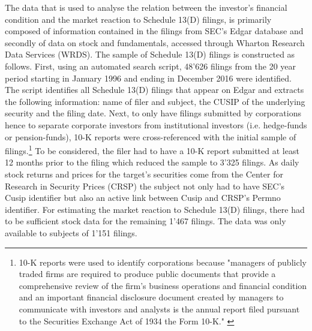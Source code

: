 \documentclass[12pt]{article}
\begin{document}
The data that is used to analyse the relation between the investor's financial condition and the market reaction to Schedule 13(D) filings,  is primarily composed of information contained in the filings from SEC's Edgar database and secondly of data on stock and fundamentals,  accessed through Wharton Research Data Services (WRDS). The sample of Schedule 13(D) filings is constructed as follows. First, using an automated search script, 48'626 filings from the 20 year period starting in January 1996 and ending in December 2016 were identified.  The script identifies all Schedule 13(D) filings that appear on Edgar and extracts the following information: name of filer and subject, the CUSIP of the underlying security and the filing date. Next, to only have filings submitted by corporations hence to separate corporate investors from institutional investors (i.e. hedge-funds or pension-funds), 10-K reports were cross-referenced with the initial sample of filings.\footnote{10-K reports were used to identify corporations because "managers of publicly traded firms are required to produce public documents that provide a comprehensive review of the firm’s business operations and financial condition and an important financial disclosure document created by managers to communicate with investors and analysts is the annual report filed pursuant to the Securities Exchange Act of 1934 the Form 10-K." \citep[p. 1643]{Loughran2014}} To be considered, the filer had to have a 10-K report submitted at least 12 months prior to the filing which reduced the sample to 3'325 filings. As daily stock returns and prices for the target's securities come from the Center for Research in Security Prices (CRSP) the subject not only had to have SEC's Cusip identifier but also an active link between Cusip and CRSP's Permno identifier. For estimating the market reaction to Schedule 13(D) filings, there had to be sufficient stock data for the remaining 1'467 filings. The data was only available to subjects of 1'151 filings. 
\end{document}
